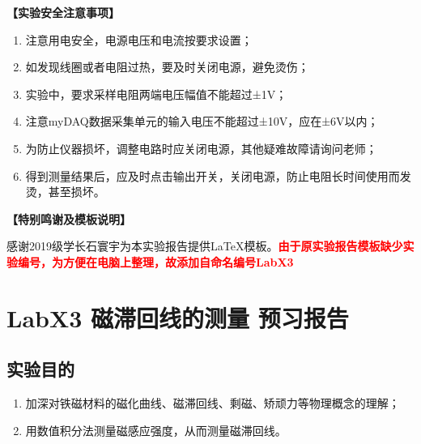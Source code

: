 \documentclass[dvipsnames, svgnames,a4paper,11pt]{article}
\begin{document}
	\textbf{【实验安全注意事项】}	
	\begin{enumerate}
		\item 注意用电安全，电源电压和电流按要求设置；
		\item 如发现线圈或者电阻过热，要及时关闭电源，避免烫伤；
		\item 实验中，要求采样电阻两端电压幅值不能超过±1V；
		\item 注意myDAQ数据采集单元的输入电压不能超过±10V，应在±6V以内；
		\item 为防止仪器损坏，调整电路时应关闭电源，其他疑难故障请询问老师；
		\item 得到测量结果后，应及时点击输出开关，关闭电源，防止电阻长时间使用而发烫，甚至损坏。		
	\end{enumerate}
	
	\textbf{【特别鸣谢及模板说明】}	
	
	感谢2019级学长石寰宇为本实验报告提供\LaTeX 模板。\textcolor{red}{\textbf{由于原实验报告模板缺少实验编号，为方便在电脑上整理，故添加自命名编号LabX3}}
	
	
	
	\clearpage
	\tableofcontents
	\clearpage
	
	
	
	\setcounter{section}{0}
	\section{LabX3 磁滞回线的测量 \quad\heiti 预习报告}
	
	\subsection{实验目的}
	\begin{enumerate}
		\item 加深对铁磁材料的磁化曲线、磁滞回线、剩磁、矫顽力等物理概念的理解；
		\item 用数值积分法测量磁感应强度，从而测量磁滞回线。
	\end{enumerate}
	
\end{document}
